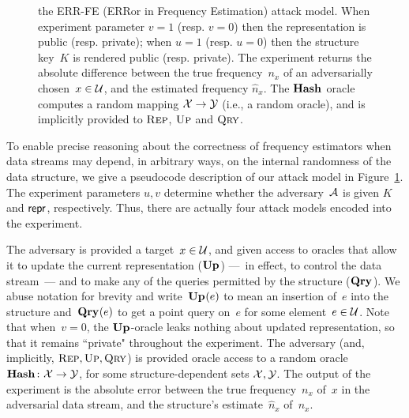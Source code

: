 \begin{figure}[tp]
\begin{pchstack}[boxed,center,space=0.5em]
\begin{pcvstack}[space=0.45em]
       \end{pcvstack}
   
       \end{pchstack}
   
   
     \caption{the ERR-FE (ERRor in Frequency Estimation) attack model. When experiment parameter $v=1$ (resp. $v=0$) then the representation is public (resp. private); when $u=1$ (resp. $u=0$) then the structure key~$K$ is rendered public (resp. private). The experiment returns the absolute difference between the true frequency~$n_x$ of an adversarially chosen~$x \in \mathcal{U}$, and the estimated frequency $\hat{n}_x$. The $\textup{\textbf{Hash}}\hspace{0.5pt}$ oracle computes a random mapping $\mathcal{X}\to\mathcal{Y}$ (i.e., a random oracle), and is implicitly provided to $\textnormal{\textsc{Rep}}$, $\textnormal{\textsc{Up}}$ and $\textnormal{\textsc{Qry}}$.}
     \label{fig:err-fe-exp} 
   \end{figure}
   

   To enable precise reasoning about the correctness of frequency estimators when data streams may depend, in arbitrary ways, on the internal randomness of the data structure, we give a pseudocode description of our attack model in Figure~\ref{fig:err-fe-exp}. The experiment parameters $u,v$ determine whether the adversary~$\mathcal{A}$ is given $K$ and $\mathsf{repr}$, respectively.  Thus, there are actually four attack models encoded into the experiment.
  
   The adversary is provided a target~$x\in\mathcal{U}$, and given access to oracles that allow it to update the current representation ($\textup{\textbf{Up}}\hspace{0.5pt}$) ---~in effect, to control the data stream~--- and to make any of the queries permitted by the structure ($\textup{\textbf{Qry}}\hspace{0.5pt}$). We abuse notation for brevity and write~$\textup{\textbf{Up}}\hspace{0.5pt}(e)$ to mean an insertion of~$e$ into the structure and~$\textup{\textbf{Qry}}\hspace{0.5pt}(e)$ to get a point query on~$e$ for some element~$e \in \mathcal{U}$. Note that when~$v=0$, the $\textup{\textbf{Up}}\hspace{0.5pt}$-oracle leaks nothing about updated representation, so that it remains ``private" throughout the experiment.  The adversary (and, implicitly, $\textnormal{\textsc{Rep}}, \textnormal{\textsc{Up}}, \textnormal{\textsc{Qry}}$) is provided oracle access to a random oracle~$\textup{\textbf{Hash}}\hspace{0.5pt} \colon \mathcal{X} \to \mathcal{Y}$, for some structure-dependent sets $\mathcal{X},\mathcal{Y}$.  The output of the experiment is the absolute error between the true frequency~$n_x$ of~$x$ in the adversarial data stream, and the structure's estimate~$\hat{n}_x$ of~$n_x$. 
   
